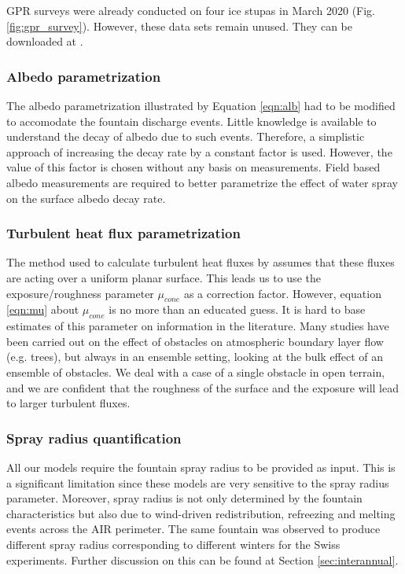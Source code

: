 \ac{GPR} surveys were already conducted on four ice stupas in March 2020 (Fig. \ref{fig:gpr_survey}). However,
these data sets remain unused. They can be downloaded at \citet{balasubramanian_suryanarayanan_2022_7056646}.

\subsubsection{Albedo parametrization}

The albedo parametrization illustrated by Equation \ref{eqn:alb} had to be modified to accomodate the fountain
discharge events. Little knowledge is available to understand the decay of albedo due to such events. Therefore,
a simplistic approach of increasing the decay rate by a constant factor is used. However, the value of this
factor is chosen without any basis on measurements. Field based albedo measurements are required to better
parametrize the effect of water spray on the surface albedo decay rate.

\subsubsection{Turbulent heat flux parametrization}

The method used to calculate turbulent heat fluxes by \citet{garrattAtmosphericBoundaryLayer1992} assumes that
these fluxes are acting over a uniform planar surface. This leads us to use the exposure/roughness parameter
$\mu_{cone}$ as a correction factor. However, equation \ref{eqn:mu} about $\mu_{cone}$ is no more than an
educated guess. It is hard to base estimates of this parameter on information in the literature. Many studies
have been carried out on the effect of obstacles on atmospheric boundary layer flow (e.g. trees), but always in
an ensemble setting, looking at the bulk effect of an ensemble of obstacles. We deal with a case of a single
obstacle in open terrain, and we are confident that the roughness of the surface and the exposure will lead to
larger turbulent fluxes.

\subsubsection{Spray radius quantification}

All our models require the fountain spray radius to be provided as input. This is a significant limitation since
these models are very sensitive to the spray radius parameter. Moreover, spray radius is not only determined by
the fountain characteristics but also due to wind-driven redistribution, refreezing and melting events across
the AIR perimeter. The same fountain was observed to produce different spray radius corresponding to different
winters for the Swiss experiments. Further discussion on this can be found at Section \ref{sec:interannual}.


